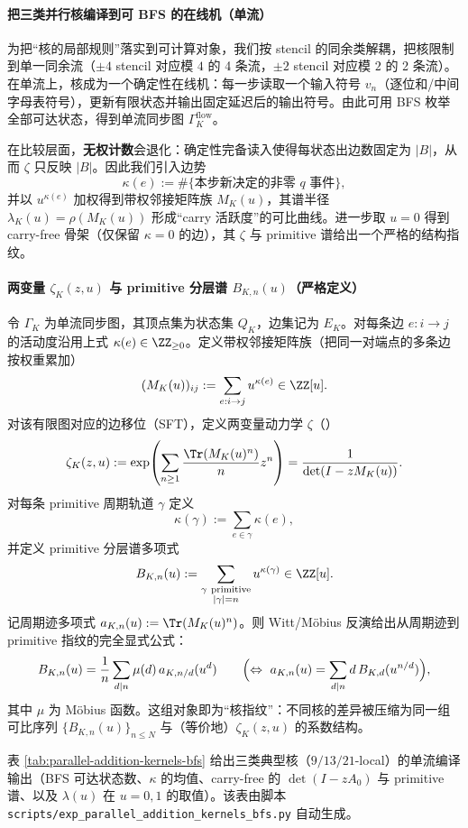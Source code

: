 \paragraph{把三类并行核编译到可 BFS 的在线机（单流）}
为把“核的局部规则”落实到可计算对象，我们按 stencil 的同余类解耦，把核限制到单一同余流（$\pm 4$ stencil 对应模 $4$ 的 4 条流，$\pm 2$ stencil 对应模 $2$ 的 2 条流）。在单流上，核成为一个确定性在线机：每一步读取一个输入符号 $v_n$（逐位和/中间字母表符号），更新有限状态并输出固定延迟后的输出符号。由此可用 BFS 枚举全部可达状态，得到单流同步图 $\Gamma^{\mathrm{flow}}_K$。

在比较层面，\textbf{无权计数}会退化：确定性完备读入使得每状态出边数固定为 $|B|$，从而 $\zeta$ 只反映 $|B|$。因此我们引入边势
\[
\kappa(e):=\#\{\text{本步新决定的非零 }q\text{ 事件}\},
\]
并以 $u^{\kappa(e)}$ 加权得到带权邻接矩阵族 $M_K(u)$，其谱半径 $\lambda_K(u)=\rho(M_K(u))$ 形成“carry 活跃度”的可比曲线。进一步取 $u=0$ 得到 carry-free 骨架（仅保留 $\kappa=0$ 的边），其 $\zeta$ 与 primitive 谱给出一个严格的结构指纹。

\paragraph{两变量 \texorpdfstring{$\zeta_K(z,u)$}{zeta(z,u)} 与 primitive 分层谱 \texorpdfstring{$B_{K,n}(u)$}{B\_{K,n}(u)}（严格定义）}
令 $\Gamma_K$ 为单流同步图，其顶点集为状态集 $Q_K$，边集记为 $E_K$。对每条边 $e:i\to j$ 的活动度沿用上式 $\kappa(e)\in\ZZ_{\ge 0}$。定义带权邻接矩阵族（把同一对端点的多条边按权重累加）
\[
(M_K(u))_{ij}:=\sum_{e:i\to j}u^{\kappa(e)}\in\ZZ[u].
\]
对该有限图对应的边移位（SFT），定义两变量动力学 $\zeta$（\cite{BrinStuck2002,ParryPollicott1990Zeta}）
\[
\zeta_K(z,u)
:=\exp\!\left(\sum_{n\ge 1}\frac{\Tr(M_K(u)^n)}{n}z^n\right)
=\frac{1}{\det(I-zM_K(u))}.
\]
对每条 primitive 周期轨道 $\gamma$ 定义
\[
\kappa(\gamma):=\sum_{e\in\gamma}\kappa(e),
\]
并定义 primitive 分层谱多项式
\[
B_{K,n}(u):=\sum_{\substack{\gamma\ \mathrm{primitive}\\ |\gamma|=n}}u^{\kappa(\gamma)}\in\ZZ[u].
\]
记周期迹多项式 $a_{K,n}(u):=\Tr(M_K(u)^n)$。则 Witt/Möbius 反演给出从周期迹到 primitive 指纹的完全显式公式：
\[
B_{K,n}(u)=\frac{1}{n}\sum_{d\mid n}\mu(d)\,a_{K,n/d}(u^d)
\qquad\Bigl(\Leftrightarrow\ a_{K,n}(u)=\sum_{d\mid n} d\,B_{K,d}(u^{n/d})\Bigr),
\]
其中 $\mu$ 为 Möbius 函数。这组对象即为“核指纹”：不同核的差异被压缩为同一组可比序列 $\{B_{K,n}(u)\}_{n\le N}$ 与（等价地）$\zeta_K(z,u)$ 的系数结构。

表 \ref{tab:parallel-addition-kernels-bfs} 给出三类典型核（$9/13/21$-local）的单流编译输出（BFS 可达状态数、$\kappa$ 的均值、carry-free 的 $\det(I-zA_0)$ 与 primitive 谱、以及 $\lambda(u)$ 在 $u=0,1$ 的取值）。该表由脚本 \texttt{scripts/exp\_parallel\_addition\_kernels\_bfs.py} 自动生成。


